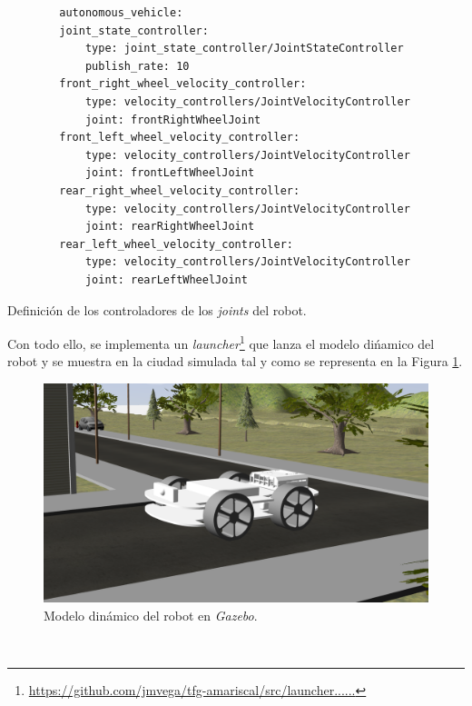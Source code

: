 \begin{code}[h]
	\begin{lstlisting}
		autonomous_vehicle:
		joint_state_controller:
			type: joint_state_controller/JointStateController
			publish_rate: 10
		front_right_wheel_velocity_controller:
			type: velocity_controllers/JointVelocityController
			joint: frontRightWheelJoint
		front_left_wheel_velocity_controller:
			type: velocity_controllers/JointVelocityController
			joint: frontLeftWheelJoint
		rear_right_wheel_velocity_controller:
			type: velocity_controllers/JointVelocityController
			joint: rearRightWheelJoint
		rear_left_wheel_velocity_controller:
			type: velocity_controllers/JointVelocityController
			joint: rearLeftWheelJoint
	\end{lstlisting}
	\caption[Definición de los controladores de los \textit{joints} del robot.]{Definición de los controladores de los \textit{joints} del robot.}
	\label{cod:controllers}
\end{code}

Con todo ello, se implementa un \textit{launcher}\footnote{\url{https://github.com/jmvega/tfg-amariscal/src/launcher......}} que lanza el modelo dińamico del robot y se muestra en
la ciudad simulada tal y como se representa en la Figura \ref{fig:modelGazebo}.\\

\begin{figure} [h!]
	\begin{center}
		\includegraphics[width=12cm]{figs/modelGazebo}
	\end{center}
	\caption{Modelo dinámico del robot en \textit{Gazebo}.}
	\label{fig:modelGazebo}
\end{figure}\

